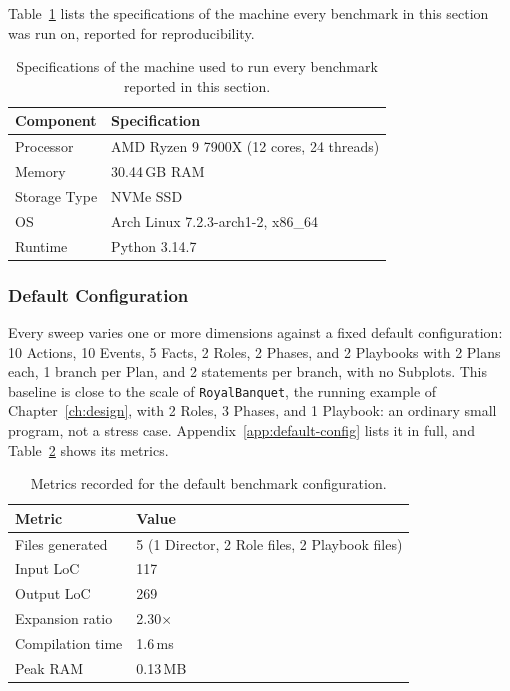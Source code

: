 Table~\ref{tab:benchmark-machine} lists the specifications of the machine every benchmark in this section was run on, reported for reproducibility.

\begin{table}[htpb]
\centering
\begin{tabular}{|l|l|}
\hline
\textbf{Component} & \textbf{Specification} \\
\hline
Processor & AMD Ryzen 9 7900X (12 cores, 24 threads) \\
Memory & 30.44\,GB RAM \\
Storage Type & NVMe SSD \\
OS & Arch Linux 7.2.3-arch1-2, x86\_64 \\
Runtime & Python 3.14.7 \\
\hline
\end{tabular}
\caption{Specifications of the machine used to run every benchmark reported in this section.}
\label{tab:benchmark-machine}
\end{table}

\subsubsection{Default Configuration}
\label{sec:benchmark-default}

Every sweep varies one or more dimensions against a fixed default configuration: 10 Actions, 10 Events, 5 Facts, 2 Roles, 2 Phases, and 2 Playbooks with 2 Plans each, 1 branch per Plan, and 2 statements per branch, with no Subplots. This baseline is close to the scale of \lstinline|RoyalBanquet|, the running example of Chapter~\ref{ch:design}, with 2 Roles, 3 Phases, and 1 Playbook: an ordinary small program, not a stress case. Appendix~\ref{app:default-config} lists it in full, and Table~\ref{tab:benchmark-default-result} shows its metrics.

\begin{table}[htpb]
\centering
\begin{tabular}{|l|l|}
\hline
\textbf{Metric} & \textbf{Value} \\
\hline
Files generated & 5 (1 Director, 2 Role files, 2 Playbook files) \\
Input LoC & 117 \\
Output LoC & 269 \\
Expansion ratio & 2.30$\times$ \\
Compilation time & 1.6\,ms \\
Peak RAM & 0.13\,MB \\
\hline
\end{tabular}
\caption{Metrics recorded for the default benchmark configuration.}
\label{tab:benchmark-default-result}
\end{table}

